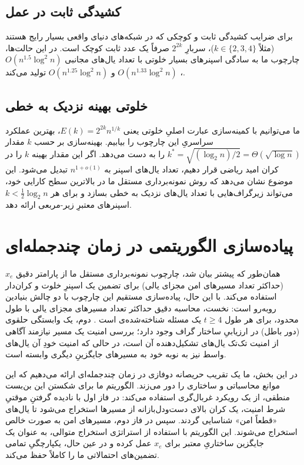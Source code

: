 \documentclass[11pt,a4paper]{report}
\theoremstyle{plain}
\theoremstyle{definition}
\theoremstyle{remark}
\begin{document}
\subsection{کشیدگی ثابت در عمل}
برای ضرایب کشیدگی ثابت و کوچکی که در شبکه‌های دنیای واقعی بسیار رایج هستند (مثلاً $k \in \{2, 3, 4\}$)، سربارِ $2^{2k}$ صرفاً یک عدد ثابت کوچک است. در این حالت‌ها، چارچوب ما به سادگی اسپنرهای بسیار خلوتی با تعداد یال‌های مجانبی $O(n^{1.5} \log^2 n)$، $O(n^{1.33} \log^2 n)$ و $O(n^{1.25} \log^2 n)$ تولید می‌کند.

\subsection{خلوتی بهینه نزدیک به خطی}
ما می‌توانیم با کمینه‌سازی عبارت اصلیِ خلوتی یعنی $E(k) = 2^{2k} n^{1/k}$، بهترین عملکرد سراسریِ این چارچوب را بیابیم. بهینه‌سازی بر حسب $k$ مقدار $k^* = \sqrt{(\log_2 n) / 2} = \Theta(\sqrt{\log n})$ را به دست می‌دهد. اگر این مقدار بهینه $k$ را در کران امید ریاضی قرار دهیم، تعداد یال‌های اسپنر به $n^{1+o(1)}$ تبدیل می‌شود. این موضوع نشان می‌دهد که روش نمونه‌برداری مستقل ما در بالاترین سطح کارایی خود، می‌تواند زیرگراف‌هایی با تعداد یال‌های نزدیک به خطی بسازد و برای هر $k < \frac{1}{2} \log_2 n$ اسپنرهای معتبرِ زیر-مربعی ارائه دهد.

\section{پیاده‌سازی الگوریتمی در زمان چندجمله‌ای}
همان‌طور که پیشتر بیان شد، چارچوب نمونه‌برداری مستقل ما از پارامتر دقیق $x_e$ (حداکثر تعداد مسیرهای امن مجزای یالی) برای تضمین یک اسپنرِ خلوت و کران‌دار استفاده می‌کند. با این حال، پیاده‌سازی مستقیم این چارچوب با دو چالش بنیادین روبه‌رو است: نخست، محاسبه دقیق حداکثر تعداد مسیرهای مجزای یالی با طول محدود، برای هر طول $t \ge 4$ یک مسئله شناخته‌شده‌ی  است \cite{itai1982complexity}. دوم، یک وابستگی حلقوی (دور باطل) در ارزیابیِ ساختار گراف وجود دارد؛ بررسی امنیت یک مسیر نیازمند آگاهی از امنیت تک‌تک یال‌های تشکیل‌دهنده آن است، در حالی که امنیت خودِ آن یال‌های واسط نیز به نوبه خود به مسیرهای جایگزینِ دیگری وابسته است.

در این بخش، ما یک تقریب حریصانه دوفازی در زمان چندجمله‌ای ارائه می‌دهیم که این موانع محاسباتی و ساختاری را دور می‌زند. الگوریتم ما برای شکستن این بن‌بست منطقی، از یک رویکرد غربال‌گری استفاده می‌کند: در فاز اول با نادیده گرفتنِ موقتیِ شرط امنیت، یک کران بالای دست‌ودل‌بازانه از مسیرها استخراج می‌شود تا یال‌های «قطعاً امن» شناسایی گردند. سپس در فاز دوم، مسیرهای امن به صورت خالص استخراج می‌شوند. این الگوریتم با استفاده از استراتژی استخراج متوالی، به عنوان یک جایگزین ساختاریِ معتبر برای $x_e$ عمل کرده و در عین حال، یکپارچگیِ تمامی تضمین‌های احتمالاتی ما را کاملاً حفظ می‌کند.
\end{document}
